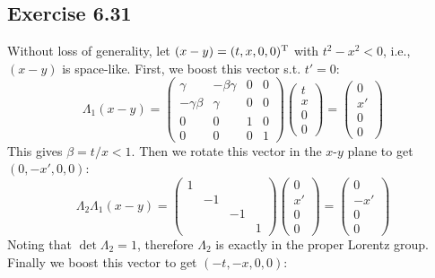 \documentclass[]{ctexart}
\begin{document}
		\subsection{Exercise 6.31}
			Without loss of generality, let $(x-y)=(t,x,0,0)^\text T$ with $t^2-x^2<0$, i.e., $(x-y)$ is space-like. First, we boost this vector s.t. $t'=0$: 
			\begin{equation*}
			\Lambda_1(x-y)=\begin{pmatrix}
			\gamma & -\beta\gamma & 0 & 0\\
			-\gamma\beta & \gamma & 0 & 0\\
			0 & 0 & 1 & 0\\
			0 & 0 & 0 & 1
			\end{pmatrix}\begin{pmatrix}
			t \\ x \\0\\0
			\end{pmatrix}=\begin{pmatrix}
			0 \\ x'\\0\\0
			\end{pmatrix}
			\end{equation*}
			This gives $\beta=t/x<1$. Then we rotate this vector in the $x$-$y$ plane to get $(0,-x',0,0)$: 
			\begin{equation*}
			\Lambda_2\Lambda_1(x-y)=\begin{pmatrix}
			1 & & & \\
			& -1 & & \\
			& & -1 & \\
			& & & 1
			\end{pmatrix}\begin{pmatrix}
			0 \\ x'\\0\\0
			\end{pmatrix}=\begin{pmatrix}
			0 \\-x'\\0\\0
			\end{pmatrix}
			\end{equation*}
			Noting that $\det \Lambda_2=1$, therefore $\Lambda_2$ is exactly in the proper Lorentz group. Finally we boost this vector to get $(-t,-x,0,0)$: 
\end{document}
